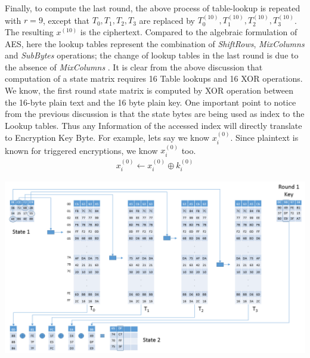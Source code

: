Finally, to compute the last round, the above process of table-lookup is repeated with $r=9$, except that $T_0,T_1,T_2,T_3$ are replaced by $T_0^{(10)},T_1^{(10)},T_2^{(10)},T_3^{(10)}$. The resulting $x^{(10)}$ is the ciphertext. Compared to the algebraic formulation of AES, here the lookup tables represent the combination of \emph{ShiftRows}, \emph{MixColumns} and \emph{SubBytes} operations; the change of lookup tables in the last round is due to the absence of \emph{MixColumns} \citep{osvik}. It is clear from the above discussion that computation of a state matrix requires 16 Table lookups and 16 XOR operations.\\

We know, the first round state matrix is computed by XOR operation between the 16-byte plain text and the 16 byte plain key. One important point to notice from the previous discussion is that the state bytes are being used as index to the Lookup tables. Thus any Information of the accessed index will directly translate to Encryption Key Byte. For example, lets say we know $x_i^{(0)}$. Since plaintext is known for triggered encryptions, we know $x_i^{(0)}$ too.\\

\begin{align*}
x_i^{(0)} \gets x_i^{(0)} \oplus k_i^{(0)}
\end{align*}


\begin{center}
\includegraphics[scale=0.4,natwidth=918,natheight=525]{Figures/aes-1-2(new).png}
\label{fig: The diagram shows how $x_4^1,x_5^1,x_6^1,x_7^1$ are computed.}
\end{center}



